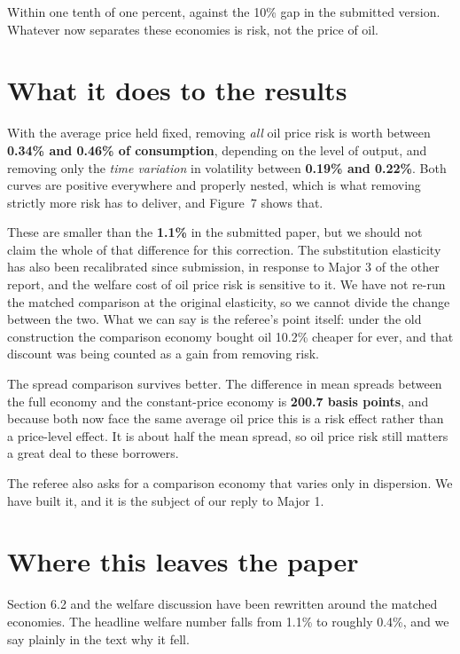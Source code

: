 \documentclass[11pt]{article}
\begin{document}
Within one tenth of one percent, against the 10\% gap in the submitted version.
Whatever now separates these economies is risk, not the price of oil.

\section*{What it does to the results}

With the average price held fixed, removing \emph{all} oil price risk is worth
between \textbf{0.34\% and 0.46\% of consumption}, depending on the level of
output, and removing only the \emph{time variation} in volatility between
\textbf{0.19\% and 0.22\%}. Both curves are positive everywhere and properly
nested, which is what removing strictly more risk has to deliver, and Figure~7
shows that.

These are smaller than the \textbf{1.1\%} in the submitted paper, but we should
not claim the whole of that difference for this correction. The substitution
elasticity has also been recalibrated since submission, in response to Major 3
of the other report, and the welfare cost of oil price risk is sensitive to it.
We have not re-run the matched comparison at the original elasticity, so we
cannot divide the change between the two. What we can say is the referee's point
itself: under the old construction the comparison economy bought oil 10.2\%
cheaper for ever, and that discount was being counted as a gain from removing
risk.

The spread comparison survives better. The difference in mean spreads between
the full economy and the constant-price economy is \textbf{200.7 basis points},
and because both now face the same average oil price this is a risk effect
rather than a price-level effect. It is about half the mean spread, so oil price
risk still matters a great deal to these borrowers.

The referee also asks for a comparison economy that varies only in dispersion.
We have built it, and it is the subject of our reply to Major 1.

\section*{Where this leaves the paper}

Section 6.2 and the welfare discussion have been rewritten around the matched
economies. The headline welfare number falls from 1.1\% to roughly 0.4\%, and we
say plainly in the text why it fell.
\end{document}
